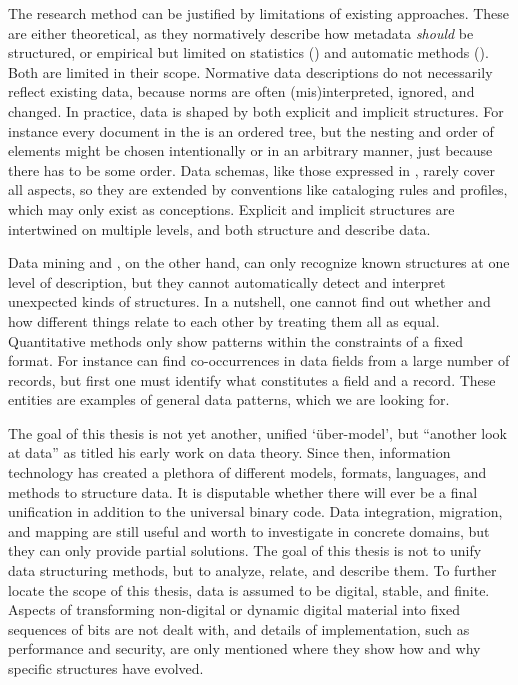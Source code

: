 %
%

The research method can be justified by limitations of existing approaches.
These are either theoretical, as they normatively describe how metadata
\emph{should} be structured, or empirical but limited on statistics () and automatic methods (). Both are limited in
their scope. Normative data descriptions do not necessarily reflect existing
data, because norms are often (mis)interpreted, ignored, and changed. In
practice, data is shaped by both explicit and implicit structures. For instance
every document in the  is an ordered
tree, but the nesting and order of elements might be chosen intentionally or in
an arbitrary manner, just because there has to be some order. Data schemas,
like those expressed in , rarely cover all aspects, so
they are extended by conventions like cataloging rules and profiles, which may
only exist as conceptions. Explicit and implicit structures are intertwined on
multiple levels, and both structure and describe data.

Data mining and , on the other hand, can only recognize known
structures at one level of description, but they cannot automatically
detect and interpret unexpected kinds of structures. In a nutshell, one cannot
find out whether and how different things relate to each other by treating them
all as equal.  Quantitative methods only show patterns within the constraints
of a fixed format. For instance  can find co-occurrences in
data fields from a large number of records, but first one must identify what
constitutes a field and a record.  These entities are examples of general data
patterns, which we are looking for.

The goal of this thesis is not yet another, unified `\"uber-model', but
``another look at data'' as \textcite{Mealy1967} titled his early work on data
theory. Since then, information technology has created a plethora of different
models, formats, languages, and methods to structure data.  It is disputable
whether there will ever be a final unification in addition to the universal
binary code. Data integration, migration, and mapping are still useful and
worth to investigate in concrete domains, but they can only provide partial
solutions. The goal of this thesis is not to unify data structuring methods, but
to analyze, relate, and describe them. To further locate the scope of this thesis,
data is assumed to be digital, stable, and finite. Aspects of transforming 
non-digital or dynamic digital material into fixed sequences of bits are not
dealt with, and details of implementation, such as performance and security, 
are only mentioned where they show how and why specific structures have evolved.


